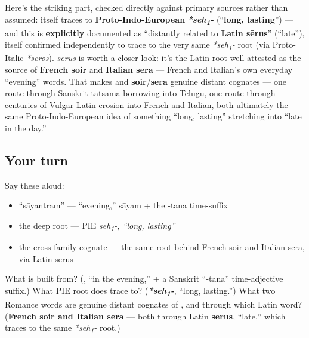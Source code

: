 \begin{cousinweb}
Here's the striking part, checked directly against primary sources rather than assumed: \textbf{} itself traces to \textbf{Proto-Indo-European} \emph{\textbf{*seh\textsubscript{1}-}} (\textquotedblleft{}\textbf{long, lasting}\textquotedblright{}) — and this is \textbf{explicitly} documented as \textquotedblleft{}distantly related to \textbf{Latin sērus}\textquotedblright{} (\textquotedblleft{}late\textquotedblright{}), itself confirmed independently to trace to the very same \emph{*seh\textsubscript{1}-} root (via Proto-Italic \emph{*sēros}). \emph{sērus} is worth a closer look: it's the Latin root well attested as the source of \textbf{French soir} and \textbf{Italian sera} — French and Italian's own everyday \textquotedblleft{}evening\textquotedblright{} words. That makes \textbf{} and \textbf{soir}/\textbf{sera} genuine distant cognates — one route through Sanskrit tatsama borrowing into Telugu, one route through centuries of Vulgar Latin erosion into French and Italian, both ultimately the same Proto-Indo-European idea of something \textquotedblleft{}long, lasting\textquotedblright{} stretching into \textquotedblleft{}late in the day.\textquotedblright{}
\end{cousinweb}

\subsection*{Your turn}
Say these aloud:

\begin{itemize}
\raggedright
  \item \textquotedblleft{}sāyantram\textquotedblright{} — \textquotedblleft{}evening,\textquotedblright{} sāyam + the -tana time-suffix
  \item the deep root — PIE \emph{seh\textsubscript{1}-, \textquotedblleft{}long, lasting\textquotedblright{}}
  \item the cross-family cognate — the same root behind French soir and Italian sera, via Latin sērus
\end{itemize}

\begin{tcolorbox}[breakable,colback=teal!4,colframe=teal!35!black,title={Before you move on}]
What is  built from? (\textbf{}, \textquotedblleft{}in the evening,\textquotedblright{} + a Sanskrit \textquotedblleft{}-tana\textquotedblright{} time-adjective suffix.) What PIE root does  trace to? (\emph{\textbf{*seh\textsubscript{1}-}}, \textquotedblleft{}long, lasting.\textquotedblright{}) What two Romance words are genuine distant cognates of , and through which Latin word? (\textbf{French soir and Italian sera} — both through Latin \textbf{sērus}, \textquotedblleft{}late,\textquotedblright{} which traces to the same \emph{*seh\textsubscript{1}-} root.)
\end{tcolorbox}

